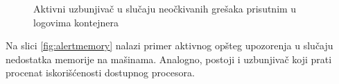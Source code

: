 \documentclass[12pt,oneside]{memoir}
\begin{document}
\begin{figure}[!ht]
  \centering
  \caption{Aktivni uzbunjivač u slučaju neočkivanih grešaka prisutnim u logovima kontejnera}
  \label{fig:alertex}
\end{figure}

Na slici \ref{fig:alertmemory} nalazi primer aktivnog opšteg upozorenja u slučaju nedostatka memorije na mašinama. Analogno, postoji i uzbunjivač koji prati procenat iskorišćenosti dostupnog procesora.
\end{document}
